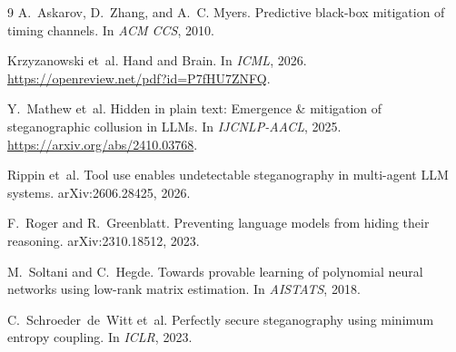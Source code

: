 \documentclass[11pt]{article}
\begin{document}

\begin{thebibliography}{9}
A.~Askarov, D.~Zhang, and A.~C. Myers.
\newblock Predictive black-box mitigation of timing channels.
\newblock In \emph{ACM CCS}, 2010.

Krzyzanowski et~al.
\newblock Hand and Brain.
\newblock In \emph{ICML}, 2026.
\newblock \url{https://openreview.net/pdf?id=P7fHU7ZNFQ}.

Y.~Mathew et~al.
\newblock Hidden in plain text: Emergence \& mitigation of steganographic
  collusion in {LLMs}.
\newblock In \emph{IJCNLP-AACL}, 2025.
\newblock \url{https://arxiv.org/abs/2410.03768}.

Rippin et~al.
\newblock Tool use enables undetectable steganography in multi-agent {LLM}
  systems.
\newblock arXiv:2606.28425, 2026.

F.~Roger and R.~Greenblatt.
\newblock Preventing language models from hiding their reasoning.
\newblock arXiv:2310.18512, 2023.

M.~Soltani and C.~Hegde.
\newblock Towards provable learning of polynomial neural networks using
  low-rank matrix estimation.
\newblock In \emph{AISTATS}, 2018.

C.~Schroeder~de~Witt et~al.
\newblock Perfectly secure steganography using minimum entropy coupling.
\newblock In \emph{ICLR}, 2023.
\end{thebibliography}

\appendix
\end{document}
